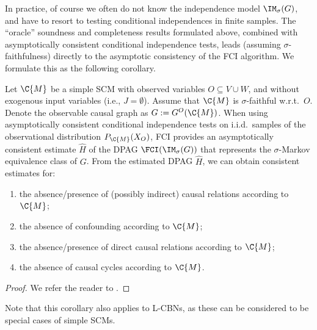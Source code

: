 In practice, of course we often do not know the independence model $\IM_\sigma(G)$, and have to resort to testing conditional independences in finite samples.
The ``oracle'' soundness and completeness results formulated above, combined with asymptotically consistent conditional independence tests, leads (assuming $\sigma$-faithfulness) directly to the asymptotic consistency of the FCI algorithm.
We formulate this as the following corollary.
\begin{Cor}
  Let $\C{M}$ be a simple SCM with observed variables $O \subseteq V \cup W$, and without exogenous input variables (i.e., $J = \emptyset$).
  Assume that $\C{M}$ is $\sigma$-faithful w.r.t.\ $O$.
  Denote the observable causal graph as $G := G^O(\C{M})$.
  When using asymptotically consistent conditional independence tests on i.i.d.\ samples of the observational distribution $P_{\C{M}}(X_O)$, FCI provides an asymptotically consistent estimate $\hat{H}$ of the DPAG $\FCI(\IM_\sigma(G))$ that represents the $\sigma$-Markov equivalence class of $G$. From the estimated DPAG $\hat{H}$, we can obtain consistent estimates for:
  \begin{enumerate}[label=(\roman*)]
  \item the absence/presence of (possibly indirect) causal relations according to $\C{M}$; 
  \item the absence of confounding according to $\C{M}$;
  \item the absence/presence of direct causal relations according to $\C{M}$;
  \item the absence of causal cycles according to $\C{M}$.
  \end{enumerate}
\end{Cor}
\begin{proof}
  We refer the reader to \cite{MooijClaassen_UAI_20}.
\end{proof}
Note that this corollary also applies to L-CBNs, as these can be considered to be special cases of simple SCMs.

